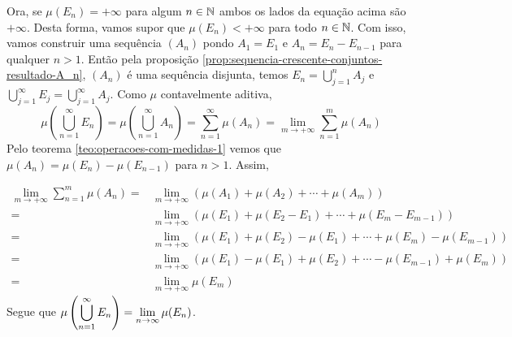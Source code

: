 \begin{prova}
    Ora, se $\mu(E_n) = +\infty$ para algum $n \in \operatorname{\mathbb{N}}$ ambos os lados da equação acima são $+\infty$.
    Desta forma, vamos supor que $\mu(E_n) < +\infty$ para todo $n \in \operatorname{\mathbb{N}}$.
    Com isso, vamos construir uma sequência $(A_n)$ pondo $A_1 = E_1$ e $A_n = E_n - E_{n-1}$ para qualquer $n>1$.
    Então pela proposição \ref{prop:sequencia-crescente-conjuntos-resultado-A_n}, $(A_n)$ é uma sequência disjunta, temos $E_n = \bigcup_{j = 1}^n A_j$ e $\bigcup_{j = 1}^\infty E_j = \bigcup_{j = 1}^\infty A_j$.
    Como $\mu$ contavelmente aditiva, 
    $$\mu\left(\bigcup_{n = 1}^\infty E_n\right)
    =\mu\left(\bigcup_{n = 1}^\infty A_n\right)
    = \sum_{n = 1}^\infty \mu(A_n)
    = \lim_{m \to +\infty}\sum_{n = 1}^m \mu(A_n)$$
    Pelo teorema \ref{teo:operacoes-com-medidas-1} vemos que $\mu(A_n) = \mu(E_n) - \mu(E_{n - 1 })$ para $n > 1$.
    Assim, 
    
    \begin{align*}
        \lim_{m \to +\infty}\sum_{n = 1}^m \mu(A_n)
        =&
        \lim_{m \to +\infty}(\mu(A_1) + \mu(A_2) + \cdots +\mu(A_m))\\
        =&
        \lim_{m \to +\infty}(\mu(E_1) + \mu(E_2 - E_1) + \cdots +\mu(E_m - E_{m-1}))\\
        =&
        \lim_{m \to +\infty}(\mu(E_1) + \mu(E_2) - \mu(E_1) + \cdots +\mu(E_m) - \mu(E_{m-1}))\\
        =&
        \lim_{m \to +\infty}(\mu(E_1) - \mu(E_1) + \mu(E_2)  + \cdots  - \mu(E_{m-1}) +\mu(E_m) )\\
        =&
        \lim_{m \to +\infty} \mu(E_m)
    \end{align*}
    Segue que $\mu\left(\displaystyle \bigcup_{n = 1}^\infty E_n\right) = \displaystyle \lim_{n \to \infty} \mu(E_n)$.





    


\end{prova}

